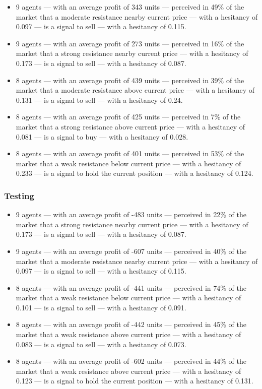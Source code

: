 {\small
  \begin{itemize}
  \item 9 agents — with an average profit of 343 units — perceived in 49\% of
    the market that a moderate resistance nearby current price — with a
    hesitancy of 0.097 — is a signal to sell — with a hesitancy of 0.115.
  \item 9 agents — with an average profit of 273 units — perceived in 16\% of
    the market that a strong resistance nearby current price — with a hesitancy
    of 0.173 — is a signal to sell — with a hesitancy of 0.087.
  \item 8 agents — with an average profit of 439 units — perceived in 39\% of
    the market that a moderate resistance above current price — with a hesitancy
    of 0.131 — is a signal to sell — with a hesitancy of 0.24.
  \item 8 agents — with an average profit of 425 units — perceived in 7\% of the
    market that a strong resistance above current price — with a hesitancy of
    0.081 — is a signal to buy — with a hesitancy of 0.028.
  \item 8 agents — with an average profit of 401 units — perceived in 53\% of
    the market that a weak resistance below current price — with a hesitancy of
    0.233 — is a signal to hold the current position — with a hesitancy of
    0.124.
  \end{itemize}
}

\subsubsection{Testing}

{\small
  \begin{itemize}
  \item 9 agents — with an average profit of -483 units — perceived in 22\% of
    the market that a strong resistance nearby current price — with a hesitancy
    of 0.173 — is a signal to sell — with a hesitancy of 0.087.
  \item 9 agents — with an average profit of -607 units — perceived in 40\% of
    the market that a moderate resistance nearby current price — with a
    hesitancy of 0.097 — is a signal to sell — with a hesitancy of 0.115.
  \item 8 agents — with an average profit of -441 units — perceived in 74\% of
    the market that a weak resistance below current price — with a hesitancy of
    0.101 — is a signal to sell — with a hesitancy of 0.091.
  \item 8 agents — with an average profit of -442 units — perceived in 45\% of
    the market that a weak resistance above current price — with a hesitancy of
    0.083 — is a signal to sell — with a hesitancy of 0.073.
  \item 8 agents — with an average profit of -602 units — perceived in 44\% of
    the market that a weak resistance above current price — with a hesitancy of
    0.123 — is a signal to hold the current position — with a hesitancy of
    0.131.
  \end{itemize}
}

